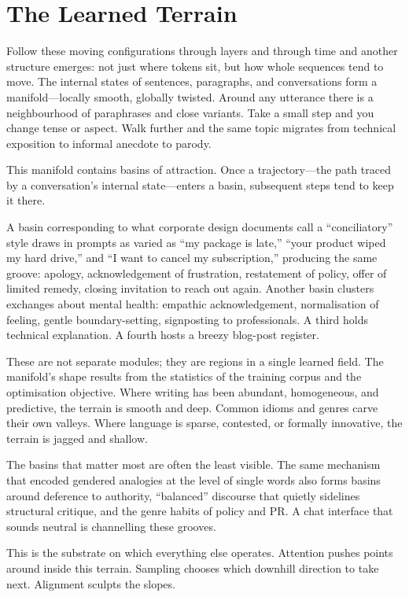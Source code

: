\documentclass[12pt,a4paper]{article}
\begin{document}
\section{The Learned Terrain}

Follow these moving configurations through layers and through time and another structure emerges: not just where tokens sit, but how whole sequences tend to move. The internal states of sentences, paragraphs, and conversations form a manifold---locally smooth, globally twisted. Around any utterance there is a neighbourhood of paraphrases and close variants. Take a small step and you change tense or aspect. Walk further and the same topic migrates from technical exposition to informal anecdote to parody.

This manifold contains basins of attraction. Once a trajectory---the path traced by a conversation's internal state---enters a basin, subsequent steps tend to keep it there.

A basin corresponding to what corporate design documents call a ``conciliatory'' style draws in prompts as varied as ``my package is late,'' ``your product wiped my hard drive,'' and ``I want to cancel my subscription,'' producing the same groove: apology, acknowledgement of frustration, restatement of policy, offer of limited remedy, closing invitation to reach out again. Another basin clusters exchanges about mental health: empathic acknowledgement, normalisation of feeling, gentle boundary-setting, signposting to professionals. A third holds technical explanation. A fourth hosts a breezy blog-post register.

These are not separate modules; they are regions in a single learned field. The manifold's shape results from the statistics of the training corpus and the optimisation objective. Where writing has been abundant, homogeneous, and predictive, the terrain is smooth and deep. Common idioms and genres carve their own valleys. Where language is sparse, contested, or formally innovative, the terrain is jagged and shallow.

The basins that matter most are often the least visible. The same mechanism that encoded gendered analogies at the level of single words also forms basins around deference to authority, ``balanced'' discourse that quietly sidelines structural critique, and the genre habits of policy and PR. A chat interface that sounds neutral is channelling these grooves.

This is the substrate on which everything else operates. Attention pushes points around inside this terrain. Sampling chooses which downhill direction to take next. Alignment sculpts the slopes.
\end{document}

